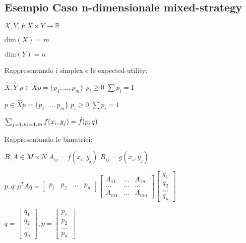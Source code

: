 \documentclass[10pt,a4paper]{report}
\begin{document}
        \subsection{Esempio Caso n-dimensionale mixed-strategy}
        \begin{center}
            $X,Y,f: X \times Y \rightarrow \mathbb{R}$

            $\text{dim}(X)=m$

            $\text{dim}(Y)=n$
        \end{center}

        Rappresentando i simplex e le expected-utility:

        $\hat{X},\hat{Y}$ $p \in \hat{X} p=\{p_1,\dots,p_m\}$ $p_i \ge 0$ $\sum p_i = 1$

                          $p \in \hat{X} p=\{p_1,\dots,p_m\}$ $p_i \ge 0$ $\sum p_i = 1$

                $\sum_{j = 1,n\\i=1,m} f(x_i,y_j) = \hat{f}(p,q)$  

        Rappresentando le bimatrici:

        $B,A \in M \times N$  $A_{ij} = f(x_i,y_j)$ 
                              $B_{ij} = g(x_i,y_j)$

        $p,q: p^T\underline{A}q = \begin{bmatrix}
                                        p_1 & p_2 & \dots & p_n
                                    \end{bmatrix}
                                    \begin{bmatrix}
                                        A_{11} & \dots & A_{1n} \\
                                        \dots & \dots & \dots \\
                                        A_{m1} & \dots & A_{mn}
                                    \end{bmatrix}
                                    \begin{bmatrix}
                                        q_1 \\ q_2\\ \dots \\ q_n
                                    \end{bmatrix}$ 
        
        $q = \begin{bmatrix}
                q_1 \\ q_2\\ \dots \\ q_n
            \end{bmatrix}, p = \begin{bmatrix}
                                p_1 \\ p_2\\ \dots \\ p_n
                            \end{bmatrix}$
\end{document}
